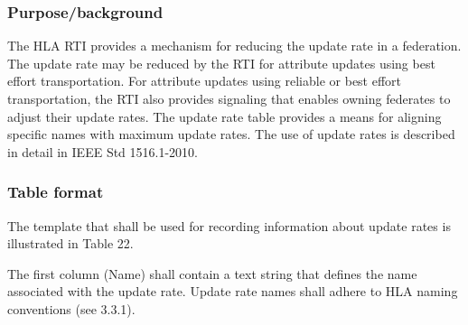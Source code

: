 \subsubsection{Purpose/background}
The HLA RTI provides a mechanism for reducing the update rate in a federation. The update rate may be reduced by the RTI for attribute updates using best effort transportation. For attribute updates using reliable or best effort transportation, the RTI also provides signaling that enables owning federates to adjust their update rates. The update rate table provides a means for aligning specific names with maximum update rates. The use of update rates is described in detail in IEEE Std 1516.1-2010.

\subsubsection{Table format}
The template that shall be used for recording information about update rates is illustrated in Table 22.

\vspace{-9pt}
\begingroup
\fontsize{9}{10.9}\selectfont
\setlength{\tabcolsep}{4pt}
\renewcommand{\arraystretch}{1.35}
\noindent{}
\endgroup\vspace{6.9pt}

The first column (Name) shall contain a text string that defines the name associated with the update rate. Update rate names shall adhere to HLA naming conventions (see 3.3.1).

